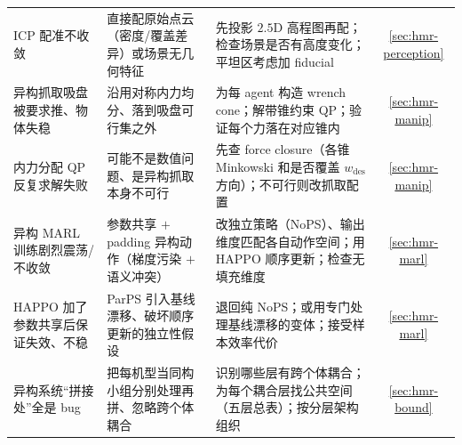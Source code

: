 \begin{table}[H]
\begin{tabular}{p{3.4cm}p{3.4cm}p{4.2cm}c}
ICP 配准不收敛 & 直接配原始点云（密度/覆盖差异）或场景无几何特征 & 先投影 $2.5\mathrm{D}$ 高程图再配；检查场景是否有高度变化；平坦区考虑加 fiducial & \cref{sec:hmr-perception} \\
异构抓取吸盘被要求推、物体失稳 & 沿用对称内力均分、落到吸盘可行集之外 & 为每 agent 构造 wrench cone；解带锥约束 QP；验证每个力落在对应锥内 & \cref{sec:hmr-manip} \\
内力分配 QP 反复求解失败 & 可能不是数值问题、是异构抓取本身不可行 & 先查 force closure（各锥 Minkowski 和是否覆盖 $w_{\mathrm{des}}$ 方向）；不可行则改抓取配置 & \cref{sec:hmr-manip} \\
异构 MARL 训练剧烈震荡/不收敛 & 参数共享 $+$ padding 异构动作（梯度污染 $+$ 语义冲突） & 改独立策略（NoPS）、输出维度匹配各自动作空间；用 HAPPO 顺序更新；检查无填充维度 & \cref{sec:hmr-marl} \\
HAPPO 加了参数共享后保证失效、不稳 & ParPS 引入基线漂移、破坏顺序更新的独立性假设 & 退回纯 NoPS；或用专门处理基线漂移的变体；接受样本效率代价 & \cref{sec:hmr-marl} \\
异构系统“拼接处”全是 bug & 把每机型当同构小组分别处理再拼、忽略跨个体耦合 & 识别哪些层有跨个体耦合；为每个耦合层找公共空间（五层总表）；按分层架构组织 & \cref{sec:hmr-bound} \\
\bottomrule
\end{tabular}
\end{table}
